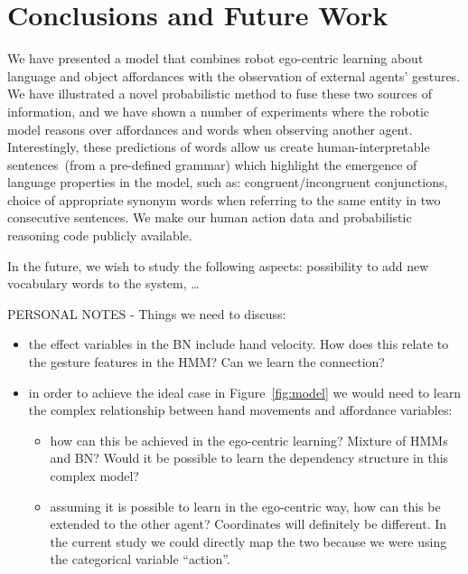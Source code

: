 
\section{Conclusions and Future Work}

We have presented a model that combines robot ego-centric learning about language and object affordances with the observation of external agents' gestures.
We have illustrated a novel probabilistic method to fuse these two sources of information, and we have shown a number of experiments where the robotic model reasons over affordances and words when observing another agent.
Interestingly, these predictions of words allow us create human-interpretable sentences~(from a pre-defined grammar) which highlight the emergence of language properties in the model, such as:
congruent/incongruent conjunctions,
choice of appropriate synonym words when referring to the same entity in two consecutive sentences.
We make our human action data and probabilistic reasoning code publicly available.


In the future, we wish to study the following aspects:
possibility to add new vocabulary words to the system,
\dots

PERSONAL NOTES - Things we need to discuss:
\begin{itemize}
\item the effect variables in the BN include hand velocity. How does this relate to the gesture features in the HMM? Can we learn the connection?
\item in order to achieve the ideal case in Figure~\ref{fig:model} we would need to learn the complex relationship between hand movements and affordance variables:
  \begin{itemize}
  \item how can this be achieved in the ego-centric learning? Mixture of HMMs and BN? Would it be possible to learn the dependency structure in this complex model?
  \item assuming it is possible to learn in the ego-centric way, how can this be extended to the other agent? Coordinates will definitely be different. In the current study we could directly map the two because we were using the categorical variable ``action''.
  \end{itemize}
\end{itemize}

